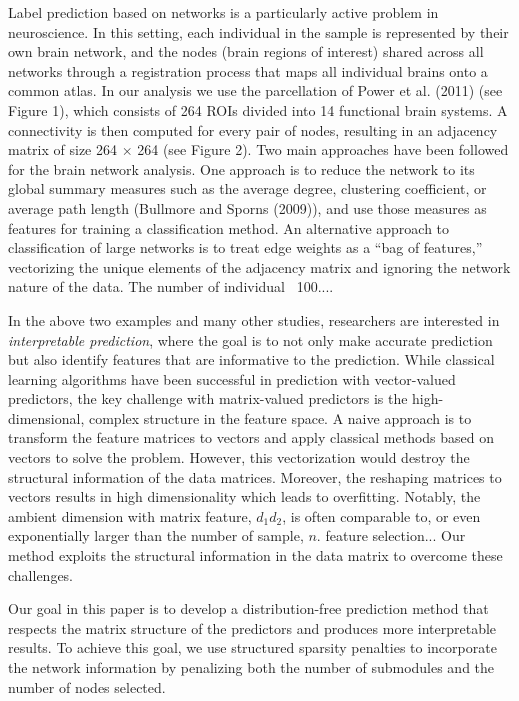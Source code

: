 \documentclass[mathptm]{statsoc}
\begin{document}
Label prediction based on networks is a particularly active problem in neuroscience. In this setting, each individual in the sample is represented by their own brain network, and the nodes (brain regions of interest) shared across all networks through a registration process that maps all individual brains onto a common atlas. In our analysis we use the parcellation of Power et al. (2011) (see Figure 1), which consists of 264 ROIs divided into 14 functional brain systems. A connectivity is then computed for every pair of nodes, resulting in an adjacency matrix of size 264 $\times$ 264 (see Figure 2). Two main approaches have been followed for the brain network analysis. One approach is to reduce the network to its global summary measures such as the average degree, clustering coefficient, or average path length (Bullmore and Sporns (2009)), and use those measures as features for training a classification method. An alternative approach to classification of large networks is to treat edge weights as a ``bag of features,'' vectorizing the unique elements of the adjacency matrix and ignoring the network nature of the data. The number of individual ~100.... 

In the above two examples and many other studies, researchers are interested in {\it interpretable prediction}, where the goal is to not only make accurate prediction but also identify features that are informative to the prediction. While classical learning algorithms have been successful in prediction with vector-valued predictors, the key challenge with matrix-valued predictors is the high-dimensional, complex structure in the feature space. 
A naive approach is to transform the feature matrices to vectors and apply classical methods based on vectors to solve the problem. However, this vectorization would destroy the structural information of the data matrices. Moreover, the reshaping matrices to vectors results in high dimensionality which leads to overfitting. 
Notably, the ambient dimension with matrix feature, $d_1d_2$, is often comparable to, or even exponentially larger than the number of sample, $n$. 
{\color{red} feature selection...}
Our method exploits the structural information in the data matrix to overcome these challenges. 

Our goal in this paper is to develop a distribution-free prediction method that respects the matrix structure of the predictors and produces more interpretable results. To achieve this goal, we use structured sparsity penalties to incorporate the network information by penalizing both the number of submodules and the number of nodes selected. 
\end{document}
